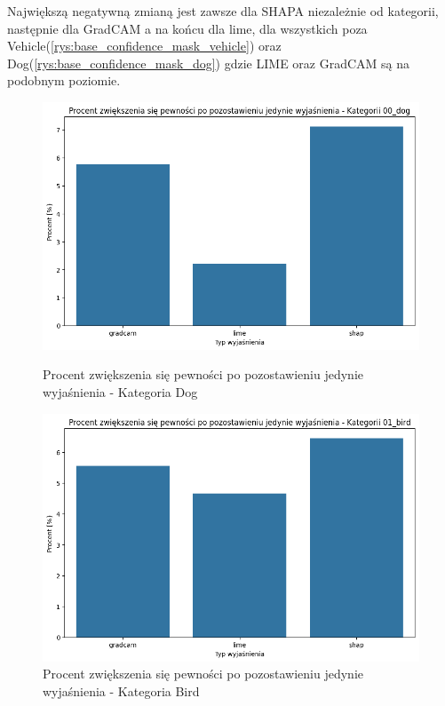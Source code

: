 Największą negatywną zmianą jest zawsze dla SHAPA niezależnie od kategorii, następnie dla GradCAM a na końcu dla lime, dla wszystkich poza Vehicle(\ref{rys:base_confidence_mask_vehicle}) oraz Dog(\ref{rys:base_confidence_mask_dog}) gdzie LIME oraz GradCAM są na podobnym poziomie.

\begin{figure}
	\centering
	\begin{minipage}[b]{0.3\textwidth}
		\includegraphics[width=.9\textwidth]{img/base_confidence_womask_percent_dog}
		\caption{Procent zwiększenia się pewności po pozostawieniu jedynie wyjaśnienia - Kategoria Dog}  \label{rys:base_confidence_womask_percent_dog}
	\end{minipage}
	\begin{minipage}[b]{0.3\textwidth}
		\centering\includegraphics[width=.9\textwidth]{img/base_confidence_womask_percent_bird}
		\caption{Procent zwiększenia się pewności po pozostawieniu jedynie wyjaśnienia - Kategoria Bird}  \label{rys:base_confidence_womask_percent_bird}
	\end{minipage}

\end{figure}
